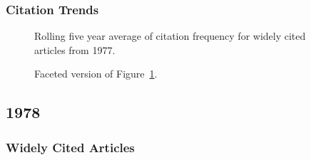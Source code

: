 \documentclass[
  10pt,
  letterpaper,
  DIV=11,
  numbers=noendperiod,
  twoside]{scrartcl}
\begin{document}
\subsubsection*{Citation Trends}\label{sec-trends-1977}

\begin{figure}


\caption{\label{fig-citation-spaghetti-1977}Rolling five year average of
citation frequency for widely cited articles from 1977.}

\end{figure}%

\begin{figure}


\caption{\label{fig-citation-facet-1977}Faceted version of
Figure~\ref{fig-citation-spaghetti-1977}.}

\end{figure}%

\newpage

\subsection{1978}\label{sec-s1978}

\subsubsection*{Widely Cited Articles}\label{widely-cited-articles-22}
\end{document}
